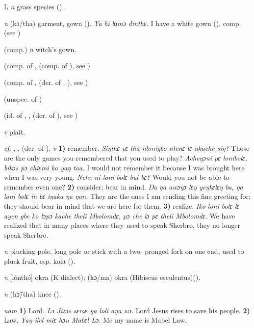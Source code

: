 \begin{letter}{L}
 \textit{n} grass species (\citealt{Pichl1967}). 

 \textit{n} (kɔ/tha) garment, gown (\citealt{Pichl1967}). \textit{Ya bi lo̹mɔ dinthɛ.} I have a white gown (\citealt{Pichl1967}). comp.  (see ) 

 (comp.) \textit{n} witch's gown.

 (comp. of ,  (comp. of ), see ) 

 (comp. of ,  (der. of , ), see ) 

 (unspec. of ) 

 (id. of , ,  (der. of ), see ) 

 \textit{v} plait.

 \textit{cf}: , ,  (der. of ). \textit{v} \textbf{1)} remember. \textit{Siŋthɛ vɛ tha nlonigbo ntenɛ lɛ nkache siŋ?} Those are the only games you remembered that you used to play? \textit{Acheŋɔni pɛ lonibolɛ, bikɔs pɔ chiɛmi ka yaŋ taa.} I would not remember it because I was brought here when I was very young. \textit{Nche ni loni bolɛ bul bɛ?} Would you not be able to remember even one? \textbf{2)} consider; bear in mind. \textit{Ŋa ŋa awɔŋɔ lɛŋ yeŋkɛlɛŋ ba, ŋa loni bolɛ in bɛ iŋaka ŋa ŋan.} They are the ones I am sending this fine greeting for; they should bear in mind that we are here for them. \textbf{3)} realize. \textit{Iko loni bolɛ lɛ ayen gbe ko lɔpɔ kache theli Mbolomdɛ, pɔ che lɔ pɛ theli Mbolomdɛ.} We have realized that in many places where they used to speak Sherbro, they no longer speak Sherbro.

 \textit{n} plucking pole, long pole or stick with a two- pronged fork on one end, used to pluck fruit, esp. kola (\citealt{Pichl1967}). 

 \textit{n} [lónthó] okra (K dialect); (kɔ/ma) okra (Hibiscus esculentus)(\citealt{Pichl1967}).

 \textit{n} (hɔ̃/tha) knee (\citealt{Pichl1967}).

 \textit{nam} \textbf{1)} Lord. \textit{Lɔ Jizɔs sɛmɛ ŋa loli aŋa wɔ.} Lord Jesus rises to save his people. \textbf{2)} Law. \textit{Yaŋ ilel miɛ hɔn Mabɛl Lɔ.} Me my name is Mabel Law.


\end{letter}
